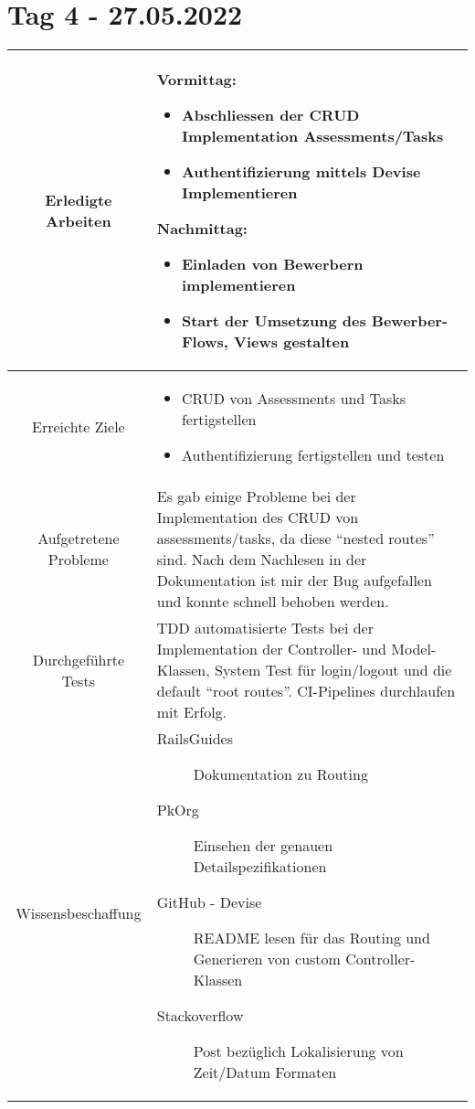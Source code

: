 \section{Tag 4 - 27.05.2022}

\begin{tabularx}{\textwidth}[H]{|c|X|}
    \hline
    Erledigte Arbeiten         &
    \textbf{Vormittag:}
    \begin{itemize}
        \item Abschliessen der CRUD Implementation Assessments/Tasks
        \item Authentifizierung mittels Devise Implementieren
    \end{itemize}
    \textbf{Nachmittag:}
    \begin{itemize}
        \item Einladen von Bewerbern implementieren
        \item Start der Umsetzung des Bewerber-Flows, Views gestalten
    \end{itemize}
    \\ \hline

    Erreichte Ziele            &
    \begin{itemize}
        \item CRUD von Assessments und Tasks fertigstellen
        \item Authentifizierung fertigstellen und testen
    \end{itemize}
    \\ \hline

    Aufgetretene Probleme      &
    Es gab einige Probleme bei der Implementation des CRUD von assessments/tasks, da diese \enquote{nested routes} sind.
    Nach dem Nachlesen in der Dokumentation ist mir der Bug aufgefallen und konnte schnell behoben werden.
    \\ \hline

    Durchgeführte Tests        &
    TDD automatisierte Tests bei der Implementation der Controller- und Model-Klassen,
    System Test für login/logout und die default \enquote{root routes}. CI-Pipelines durchlaufen mit Erfolg.
    \\ \hline

    Wissensbeschaffung         &
    \begin{description}
        \item[RailsGuides] Dokumentation zu Routing
        \item[PkOrg] Einsehen der genauen Detailspezifikationen
        \item[GitHub - Devise] README lesen für das Routing und Generieren von custom Controller-Klassen
        \item[Stackoverflow] Post bezüglich Lokalisierung von Zeit/Datum Formaten
    \end{description}
    \\ \hline


\end{tabularx}
